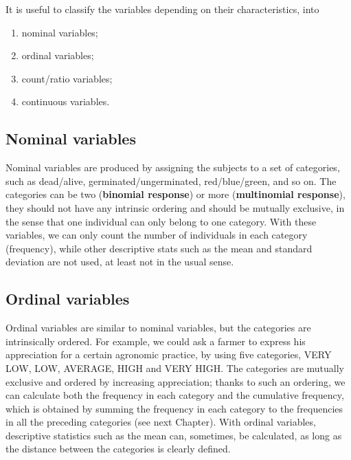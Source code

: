 \documentclass[a4paper,12pt,oneside]{book}
\providecommand{\tightlist}{%
  \setlength{\itemsep}{0pt}\setlength{\parskip}{0pt}}
\begin{document}
It is useful to classify the variables depending on their characteristics, into

\begin{enumerate}
\def\labelenumi{\arabic{enumi}.}
\tightlist
\item
  nominal variables;
\item
  ordinal variables;
\item
  count/ratio variables;
\item
  continuous variables.
\end{enumerate}

\hypertarget{nominal-variables}{%
\subsection{Nominal variables}\label{nominal-variables}}

Nominal variables are produced by assigning the subjects to a set of categories, such as dead/alive, germinated/ungerminated, red/blue/green, and so on. The categories can be two (\textbf{binomial response}) or more (\textbf{multinomial response}), they should not have any intrinsic ordering and should be mutually exclusive, in the sense that one individual can only belong to one category. With these variables, we can only count the number of individuals in each category (frequency), while other descriptive stats such as the mean and standard deviation are not used, at least not in the usual sense.

\hypertarget{ordinal-variables}{%
\subsection{Ordinal variables}\label{ordinal-variables}}

Ordinal variables are similar to nominal variables, but the categories are intrinsically ordered. For example, we could ask a farmer to express his appreciation for a certain agronomic practice, by using five categories, VERY LOW, LOW, AVERAGE, HIGH and VERY HIGH. The categories are mutually exclusive and ordered by increasing appreciation; thanks to such an ordering, we can calculate both the frequency in each category and the cumulative frequency, which is obtained by summing the frequency in each category to the frequencies in all the preceding categories (see next Chapter). With ordinal variables, descriptive statistics such as the mean can, sometimes, be calculated, as long as the distance between the categories is clearly defined.
\end{document}
